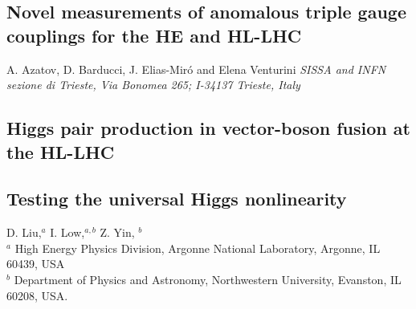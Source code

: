 \documentclass[../report.tex]{subfiles}
\providecommand{\main}{..}
\begin{document}




\subsection{Novel measurements of anomalous triple gauge couplings for the HE and HL-LHC} \label{sec:WZtrans}
\begin{center}
{A. Azatov, D. Barducci, J. Elias-Mir\'o and Elena Venturini}
 {\it \small
SISSA and INFN sezione di Trieste, Via Bonomea 265; I-34137 Trieste, Italy\\
 }
\end{center}



\subsection{Higgs pair production in vector-boson fusion at the HL-LHC}






\subsection{Testing the universal Higgs nonlinearity}
% 
\label{sect-illus}
\begin{center}
 {D. Liu,$^a$   I. Low,$^{a,b} $ Z. Yin, $^b$\\
}
 {\small $^a$ High Energy Physics Division, Argonne National Laboratory, Argonne, IL 60439, USA \\
$^b$ Department of Physics and Astronomy, Northwestern University, Evanston, IL 60208, USA.}
\end{center}




\end{document}
